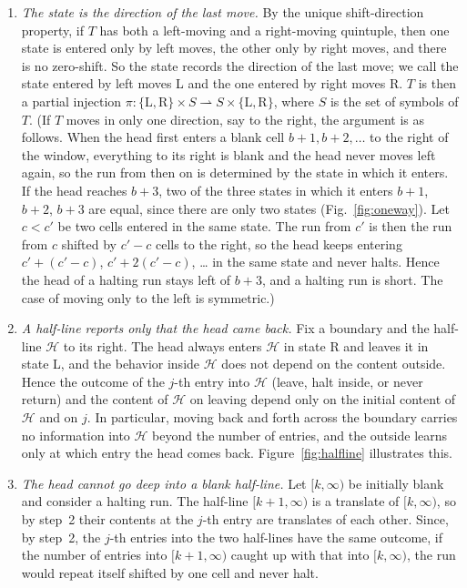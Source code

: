 \documentclass{article}
\theoremstyle{definition}
\theoremstyle{remark}
\newcommand{\rmL}{\mathrm{L}}
\newcommand{\rmR}{\mathrm{R}}
\begin{document}
\begin{enumerate}
\item \emph{The state is the direction of the last move.}
By the unique shift-direction property, if $T$ has both a left-moving and a right-moving quintuple, then one state is entered only by left moves, the other only by right moves, and there is no zero-shift.
So the state records the direction of the last move; we call the state entered by left moves L and the one entered by right moves R. $T$ is then a partial injection $\pi:\{\rmL,\rmR\}\times S\rightharpoonup S\times\{\rmL,\rmR\}$, where $S$ is the set of symbols of $T$.
(If $T$ moves in only one direction, say to the right, the argument is as follows. When the head first enters a blank cell $b+1,b+2,\dots$ to the right of the window, everything to its right is blank and the head never moves left again, so the run from then on is determined by the state in which it enters. If the head reaches $b+3$, two of the three states in which it enters $b+1$, $b+2$, $b+3$ are equal, since there are only two states (Fig.~\ref{fig:oneway}). Let $c<c'$ be two cells entered in the same state. The run from $c'$ is then the run from $c$ shifted by $c'-c$ cells to the right, so the head keeps entering $c'+(c'-c)$, $c'+2(c'-c)$, \dots{} in the same state and never halts. Hence the head of a halting run stays left of $b+3$, and a halting run is short. The case of moving only to the left is symmetric.)
\item \emph{A half-line reports only that the head came back.}
Fix a boundary and the half-line $\mathcal{H}$ to its right.
The head always enters $\mathcal{H}$ in state R and leaves it in state L, and the behavior inside $\mathcal{H}$ does not depend on the content outside.
Hence the outcome of the $j$-th entry into $\mathcal{H}$ (leave, halt inside, or never return) and the content of $\mathcal{H}$ on leaving depend only on the initial content of $\mathcal{H}$ and on $j$.
In particular, moving back and forth across the boundary carries no information into $\mathcal{H}$ beyond the number of entries, and the outside learns only at which entry the head comes back.
Figure~\ref{fig:halfline} illustrates this.
\item \emph{The head cannot go deep into a blank half-line.}
Let $[k,\infty)$ be initially blank and consider a halting run.
The half-line $[k+1,\infty)$ is a translate of $[k,\infty)$, so by step~2 their contents at the $j$-th entry are translates of each other.
Since, by step~2, the $j$-th entries into the two half-lines have the same outcome, if the number of entries into $[k+1,\infty)$ caught up with that into $[k,\infty)$, the run would repeat itself shifted by one cell and never halt.

\end{enumerate}
\end{document}
